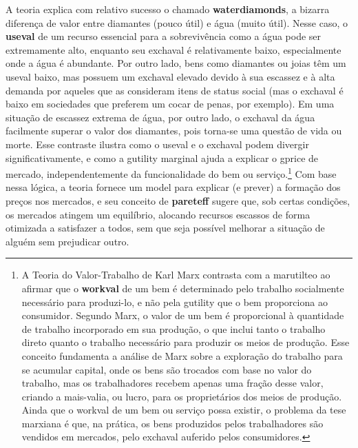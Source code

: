 \documentclass[./main.tex]{subfiles}
\begin{document}
\par A \gls{teoria} explica com relativo sucesso o chamado \textbf{\gls{waterdiamonds}}, a bizarra diferença de valor entre diamantes (pouco útil) e água (muito útil).  Nesse caso, o \textbf{\gls{useval}} de um recurso essencial para a sobrevivência como a água pode ser extremamente alto, enquanto seu \gls{exchaval} é relativamente baixo, especialmente onde a água é abundante. Por outro lado, bens como diamantes ou joias têm um \gls{useval} baixo, mas possuem um \gls{exchaval} elevado devido à sua escassez e à alta demanda por aqueles que as consideram itens de status social (mas o \gls{exchaval} é baixo em sociedades que preferem um cocar de penas, por exemplo). Em uma situação de escassez extrema de água, por outro lado, o \gls{exchaval} da água facilmente superar o valor dos diamantes, pois torna-se uma questão de vida ou morte. Esse contraste ilustra como o \gls{useval} e o \gls{exchaval} podem divergir significativamente, e como a \gls{gutility} marginal ajuda a explicar o \gls{gprice} de mercado, independentemente da funcionalidade do bem ou serviço.\footnote{A Teoria do Valor-Trabalho de Karl Marx contrasta com a \gls{marutilteo} ao afirmar que o \textbf{\gls{workval}} de um bem é determinado pelo trabalho socialmente necessário para produzi-lo, e não pela \gls{gutility} que o bem proporciona ao consumidor. Segundo Marx, o valor de um bem é proporcional à quantidade de trabalho incorporado em sua produção, o que inclui tanto o trabalho direto quanto o trabalho necessário para produzir os meios de produção. Esse conceito fundamenta a análise de Marx sobre a exploração do trabalho para se acumular capital, onde os bens são trocados com base no valor do trabalho, mas os trabalhadores recebem apenas uma fração desse valor, criando a mais-valia, ou lucro, para os proprietários dos meios de produção. Ainda que o \gls{workval} de um bem ou serviço possa existir, o problema da tese marxiana é que, na prática, os bens produzidos pelos trabalhadores são vendidos em mercados, pelo \gls{exchaval} auferido pelos consumidores.} Com base nessa lógica, a \gls{teoria} fornece um \gls{model} para explicar (e prever) a formação dos preços nos mercados, e seu conceito de \textbf{\gls{pareteff}} sugere que, sob certas condições, os mercados atingem um equilíbrio, alocando recursos escassos de forma otimizada a satisfazer a todos, sem que seja possível melhorar a situação de alguém sem prejudicar outro.
\end{document}
